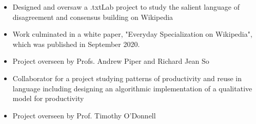 \documentclass[10pt,ragged2e]{altacv}
\begin{document}
\begin{itemize}
\item Designed and oversaw a .txtLab project to study the salient language of disagreement and consensus building on Wikipedia
\item Work culminated in a white paper, "Everyday Specialization on Wikipedia", which was published in September 2020.
\item Project overseen by Profs. Andrew Piper and Richard Jean So
\end{itemize}

\divider

\begin{itemize}
\item Collaborator for a project studying patterns of productivity and reuse in language including designing an algorithmic implementation of a qualitative model for productivity
\item Project overseen by Prof. Timothy O'Donnell
\end{itemize}


\clearpage
\end{document}
